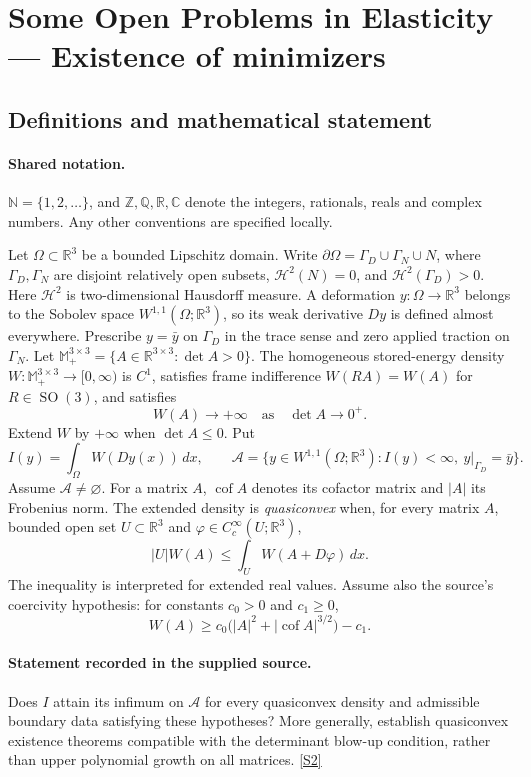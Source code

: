 \documentclass[11pt]{book}
\newcommand{\sref}[2]{\hyperlink{source:#1:#2}{[S#2]}}
\begin{document}
\section{Some Open Problems in Elasticity — Existence of minimizers}\label{statement}

\subsection{Definitions and mathematical statement}

\paragraph{Shared notation.}$\mathbb N=\{1,2,\ldots\}$, and $\mathbb Z,\mathbb Q,\mathbb R,\mathbb C$ denote the integers, rationals, reals and complex numbers. Any other conventions are specified locally.


Let $\Omega\subset\mathbb R^3$ be a bounded Lipschitz domain. Write $\partial\Omega=\Gamma_D\cup\Gamma_N\cup N$, where $\Gamma_D,\Gamma_N$ are disjoint relatively open subsets, $\mathcal H^2(N)=0$, and $\mathcal H^2(\Gamma_D)>0$. Here $\mathcal H^2$ is two-dimensional Hausdorff measure. A deformation $y:\Omega\to\mathbb R^3$ belongs to the Sobolev space $W^{1,1}(\Omega;\mathbb R^3)$, so its weak derivative $Dy$ is defined almost everywhere. Prescribe $y=\bar y$ on $\Gamma_D$ in the trace sense and zero applied traction on $\Gamma_N$.
Let $\mathbb M_+^{3\times3}=\{A\in\mathbb R^{3\times3}:\det A>0\}$. The homogeneous stored-energy density $W:\mathbb M_+^{3\times3}\to[0,\infty)$ is $C^1$, satisfies frame indifference $W(RA)=W(A)$ for $R\in\operatorname{SO}(3)$, and satisfies
\[
 W(A)\longrightarrow+\infty\quad\text{as}\quad\det A\longrightarrow0^+.
\]
Extend $W$ by $+\infty$ when $\det A\le0$. Put
\[
 I(y)=\int_\Omega W(Dy(x))\,dx,\qquad
 \mathcal A=\{y\in W^{1,1}(\Omega;\mathbb R^3):I(y)<\infty,\ y|_{\Gamma_D}=\bar y\}.
\]
Assume $\mathcal A\ne\varnothing$. For a matrix $A$, $\operatorname{cof}A$ denotes its cofactor matrix and $|A|$ its Frobenius norm.
The extended density is \emph{quasiconvex} when, for every matrix $A$, bounded open set $U\subset\mathbb R^3$ and $\varphi\in C_c^\infty(U;\mathbb R^3)$,
\[
 |U|W(A)\le\int_U W(A+D\varphi)\,dx.
\]
The inequality is interpreted for extended real values. Assume also the source's coercivity hypothesis: for constants $c_0>0$ and $c_1\ge0$,
\[
 W(A)\ge c_0\bigl(|A|^2+|\operatorname{cof}A|^{3/2}\bigr)-c_1.
\]
\paragraph{Statement recorded in the supplied source.}
Does $I$ attain its infimum on $\mathcal A$ for every quasiconvex density and admissible boundary data satisfying these hypotheses? More generally, establish quasiconvex existence theorems compatible with the determinant blow-up condition, rather than upper polynomial growth on all matrices. \sref{statement}{2}
\end{document}
